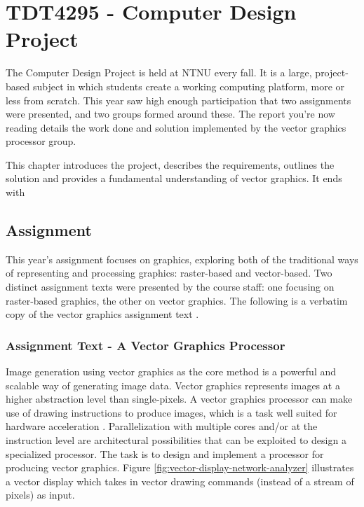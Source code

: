 \chapter{TDT4295 - Computer Design Project}
\label{sec:intro}

The Computer Design Project is held at NTNU every fall.
It is a large, project-based subject in which students create a working computing platform, more or less from scratch.
This year saw high enough participation that two assignments were presented, and two groups formed around these.
The report you're now reading details the work done and solution implemented by the vector graphics processor group.

This chapter introduces the project, describes the requirements, outlines the solution and provides a fundamental understanding of vector graphics. It ends with

\section{Assignment}

This year's assignment focuses on graphics, exploring both of the traditional ways of representing and processing graphics: raster-based and vector-based.
Two distinct assignment texts were presented by the course staff: one focusing on raster-based graphics, the other on vector graphics.
The following is a verbatim copy of the vector graphics assignment text \cite{assignment-text}.

\subsection{Assignment Text - A Vector Graphics Processor}

Image generation using vector graphics as the core method is a powerful and scalable way of generating image data.
Vector graphics represents images at a higher abstraction level than single-pixels.
A vector graphics processor can make use of drawing instructions to produce images, which is a task well suited for hardware acceleration \cite{openvg}.
Parallelization with multiple cores and/or at the instruction level are architectural possibilities that can be exploited to design a specialized processor.
The task is to design and implement a processor for producing vector graphics.
Figure \ref{fig:vector-display-network-analyzer} illustrates a vector display which takes in vector drawing commands (instead of a stream of pixels) as input.

